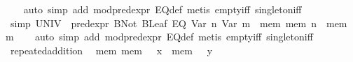 \begin{isabellebody}
%
\isadelimproof
\ \ %
\endisadelimproof
%
\isatagproof
{}\isamarkupfalse%
\ {}auto\ simp\ add{}\ mod{}pred{}expr\ EQ{}def{}\ {}metis\ empty{}iff\ singleton{}iff{}{}%
\endisatagproof
{\isafoldproof}%
%
\isadelimproof
\isanewline
%
\endisadelimproof
\isanewline
{}\isamarkupfalse%
\ {}simp{}{}\ {}UNIV\ {}\ pred{}expr\ {}BNot\ {}BLeaf\ {}EQ\ {}Var\ n{}\ {}Var\ m{}{}{}{}\ {}\ {}mem{}\ mem\ n\ {}\ mem\ m{}{}\isanewline
%
\isadelimproof
\ \ %
\endisadelimproof
%
\isatagproof
{}\isamarkupfalse%
\ {}auto\ simp\ add{}\ mod{}pred{}expr\ EQ{}def{}\ {}metis\ empty{}iff\ singleton{}iff{}{}%
\endisatagproof
{\isafoldproof}%
%
\isadelimproof
\isanewline
%
\endisadelimproof
\isanewline
{}\isamarkupfalse%
\ repeated{}addition{}\isanewline
\ \ {}{}mem{}\ mem\ {}\ {}\ x\ {}\ mem\ {}\ {}\ y{}\ {}\isanewline

\end{isabellebody}
